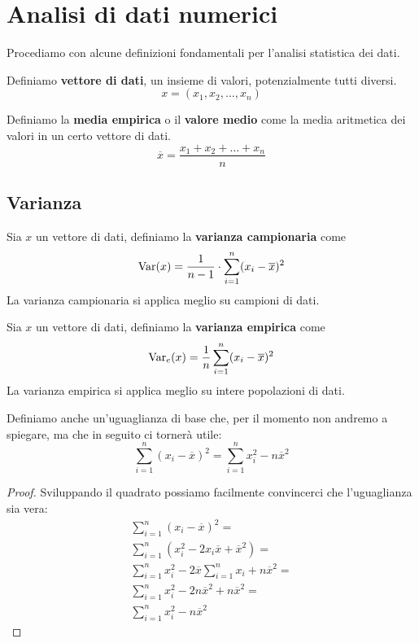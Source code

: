 \chapter{Analisi di dati numerici}
Procediamo con alcune definizioni fondamentali per l'analisi statistica dei dati.

\begin{definition} \label{vettore}
	Definiamo \textbf{vettore di dati}, un insieme di valori, potenzialmente tutti diversi.
	\[ x = (x_1, x_2, \dots, x_n) \]
\end{definition}

\begin{definition}
	Definiamo la \textbf{media empirica} o il \textbf{valore medio} come la media aritmetica dei
	valori in un certo vettore di dati.
	\[ \overline{x} = \frac{x_1 + x_2 + \dots + x_n}{n} \]
\end{definition}

\section{Varianza}

\begin{definition}
	Sia $x$ un vettore di dati, definiamo la \textbf{varianza campionaria} come
	\[ \operatorname{Var}(x) = \frac{1}{n - 1} \cdot \sum_{i=1}^n (x_i - \overline{x})^2 \]
	La varianza campionaria si applica meglio su campioni di dati.
\end{definition}

\begin{definition}
	Sia $x$ un vettore di dati, definiamo la \textbf{varianza empirica} come
	\[ \operatorname{Var}_e(x) = \frac{1}{n} \sum_{i=1}^n (x_i - \overline{x})^2 \]
	La varianza empirica si applica meglio su intere popolazioni di dati.
\end{definition}

Definiamo anche un'uguaglianza di base che, per il momento non andremo a spiegare, ma che in
seguito ci tornerà utile:
\[ \sum_{i=1}^n (x_i - \overline{x})^2 = \sum_{i=1}^n x_i^2 - n \overline{x}^2 \]
\begin{proof}
	Sviluppando il quadrato possiamo facilmente convincerci che l'uguaglianza sia vera:
	\begin{align*}
		\sum_{i=1}^n (x_i - \overline{x})^2 =                                     \\
		\sum_{i=1}^n (x_i^2 - 2 x_i \overline{x} + \overline{x}^2) =              \\
		\sum_{i=1}^n x_i^2 - 2 \overline{x} \sum_{i=1}^n x_i + n \overline{x}^2 = \\
		\sum_{i=1}^n x_i^2 - 2 n \overline{x}^2 + n \overline{x}^2 =              \\
		\sum_{i=1}^n x_i^2 - n \overline{x}^2
	\end{align*}
\end{proof}

